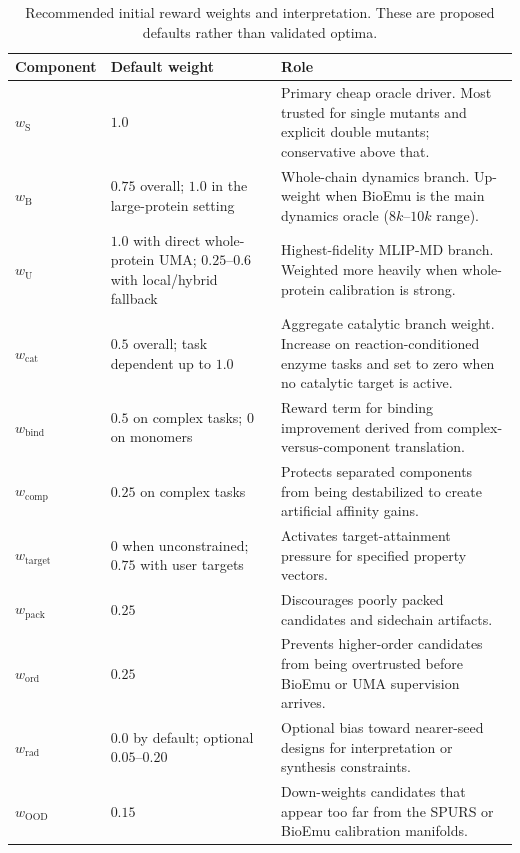 \documentclass[11pt]{article}
\begin{document}
	\begin{table}[H]
		\centering
		\caption{Recommended initial reward weights and interpretation. These are proposed defaults rather than validated optima.}
		\label{tab:rewardweights}
		\begin{tabularx}{\textwidth}{>{\raggedright\arraybackslash}p{} >{\raggedright\arraybackslash}p{} >{\raggedright\arraybackslash}X}
			\toprule
			Component & Default weight & Role \\
			\midrule
			$w_{\mathrm S}$ & $1.0$ & Primary cheap oracle driver. Most trusted for single mutants and explicit double mutants; conservative above that. \\
			$w_{\mathrm B}$ & $0.75$ overall; $1.0$ in the large-protein setting & Whole-chain dynamics branch. Up-weight when BioEmu is the main dynamics oracle ($8k$--$10k$ range). \\
			$w_{\mathrm U}$ & $1.0$ with direct whole-protein UMA; $0.25$--$0.6$ with local/hybrid fallback & Highest-fidelity MLIP-MD branch. Weighted more heavily when whole-protein calibration is strong. \\
			$w_{\mathrm{cat}}$ & $0.5$ overall; task dependent up to $1.0$ & Aggregate catalytic branch weight. Increase on reaction-conditioned enzyme tasks and set to zero when no catalytic target is active. \\
			$w_{\mathrm{bind}}$ & $0.5$ on complex tasks; $0$ on monomers & Reward term for binding improvement derived from complex-versus-component translation. \\
			$w_{\mathrm{comp}}$ & $0.25$ on complex tasks & Protects separated components from being destabilized to create artificial affinity gains. \\
			$w_{\mathrm{target}}$ & $0$ when unconstrained; $0.75$ with user targets & Activates target-attainment pressure for specified property vectors. \\
			$w_{\mathrm{pack}}$ & $0.25$ & Discourages poorly packed candidates and sidechain artifacts. \\
			$w_{\mathrm{ord}}$ & $0.25$ & Prevents higher-order candidates from being overtrusted before BioEmu or UMA supervision arrives. \\
			$w_{\mathrm{rad}}$ & $0.0$ by default; optional $0.05$--$0.20$ & Optional bias toward nearer-seed designs for interpretation or synthesis constraints. \\
			$w_{\mathrm{OOD}}$ & $0.15$ & Down-weights candidates that appear too far from the SPURS or BioEmu calibration manifolds. \\
			\bottomrule
		\end{tabularx}
	\end{table}
	
\end{document}

